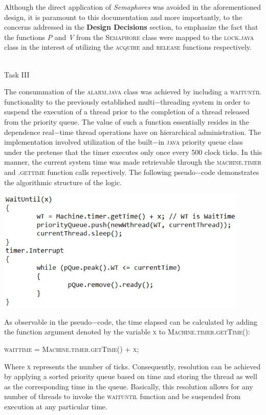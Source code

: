 \documentclass[12pt]{article}
\begin{document}
{Although the direct application of \textit{Semaphores} was avoided in the aforementioned design, it is paramount to this documentation and more importantly, to the concerns addressed in the \textbf{Design Decisions} section, to emphasize the fact that the functions \textit{P} and \textit{V} from the \textsc{Semaphore} class were mapped to the \textsc{lock.java} class in the interest of utilizing the \textsc{acquire} and \textsc{release} functions respectively.
\\\\  
\begin{center}Task III\end{center}
The consummation of the \textsc{alarm.java} class was achieved by including a \textsc{waituntil} functionality to the previously established multi$-$threading system in order to suspend the execution of a thread prior to the completion of a thread released from the priority queue. The value of such a function essentially resides in the dependence real$-$time thread operations have on hierarchical administration. The implementation involved  utilization of the built$-$in \textsc{java} priority queue class under the pretense that the timer executes only once every 500 clock ticks. In this manner, the current system time was made retrievable through the \textsc{machine.timer} and \textsc{.gettime} function calls repectively. The following pseudo$-$code demonstrates the algorithmic structure of the logic.
\begin{center} \includegraphics[width=120mm]{pic3.png} \end{center} 
As observable in the pseudo$-$code, the time elapsed can be calculated by adding the function argument denoted by the variable \textsc{x} to \textsc{Machine.timer.getTime()}: \begin{center} \textsc{waittime} = \textsc{Machine.timer.getTime()} + \textsc{x}; \end{center}Where \textsc{x} represents the number of ticks. Consequently, resolution can be achieved by applying a sorted priority queue based on time and storing the thread as well as the corresponding time in the queue. Basically, this resolution allows for any number of threads to invoke the \textsc{waituntil} function and be suspended from execution at any particular time.
}
\end{document}
